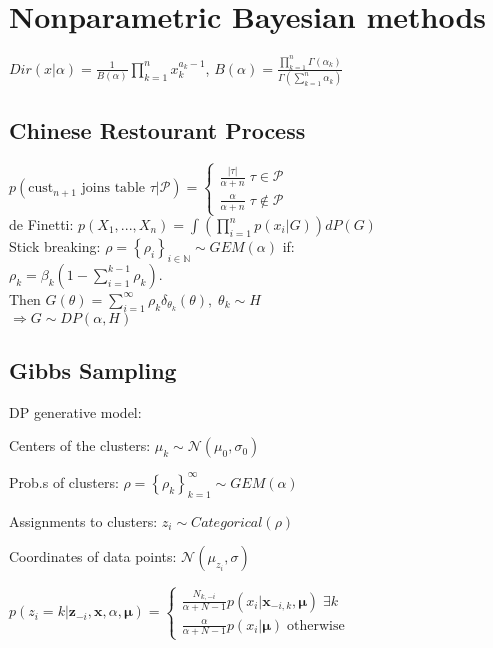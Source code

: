 \section{Nonparametric Bayesian methods}
$Dir(x|\alpha) = \frac{1}{B(\alpha)} \prod_{k=1}^n x_k^{a_k - 1}$, $B(\alpha) = \frac{\prod_{k=1}^n \Gamma(\alpha_k)}{\Gamma(\sum_{k=1}^n \alpha_k)}$ 
\subsection*{Chinese Restourant Process}
\(
   p(\text{cust}_{n+1} \text{ joins table } \tau\vert\mathcal{P})=
   \begin{cases}
      \frac{\vert\tau\vert}{\alpha + n} \; \tau\in\mathcal{P} \\
      \frac{\alpha}{\alpha + n} \;\tau\notin\mathcal{P} 
   \end{cases}
\)\\ 
de Finetti: $p(X_1, ..., X_n) {=} \int (\prod_{i=1}^n p(x_i|G))dP(G)$ \\
Stick breaking: $\rho = \left\{\rho_i\right\}_{i \in \mathbb{N}} \sim GEM(\alpha)$ if:\\
$\rho_k = \beta_k\left(1-\sum_{i=1}^{k-1}\rho_k\right)$.\\
Then $G(\theta)=\sum_{i=1}^{\infty}\rho_k \delta_{\theta_k}(\theta),\;\theta_k\sim H$\\
$\Rightarrow G\sim DP(\alpha,H)$
\subsection*{Gibbs Sampling}
DP generative model: \\
\begin{inparaitem}[\color{red}\textbullet]
\item Centers of the clusters: $\mu_k \sim \mathcal{N}(\mu_0, \sigma_0)$ \\
\item Prob.s of clusters: $\rho = \left\{\rho_k\right\}_{k=1}^\infty \sim  GEM(\alpha)$ \\
\item Assignments to clusters: $z_i \sim Categorical(\rho)$ \\
\item Coordinates of data points: $\mathcal{N}(\mu_{z_i}, \sigma)$\\
\end{inparaitem}
\(
   p(z_i=k|\bm{z}_{-i},\bm{x},\alpha,\bm{\mu}) = 
   \begin{cases}
      \frac{N_{k,-i}}{\alpha + N - 1} p(x_i|\bm{x}_{-i,k},\bm{\mu}) \;\exists k \\
      \frac{\alpha}{\alpha + N - 1} p(x_i|\bm{\mu}) \;\text{otherwise}
   \end{cases}
\)